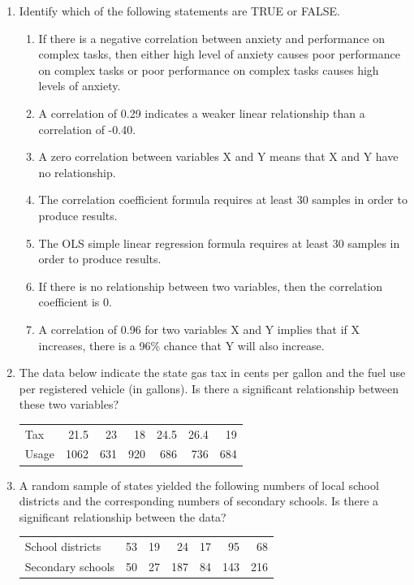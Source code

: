 \documentclass{article}
\begin{document}
\begin{enumerate}
    \item Identify which of the following statements are TRUE or FALSE.
    \begin{enumerate}
        \item If there is a negative correlation between anxiety and performance on complex tasks, then either high level of anxiety causes poor performance on complex tasks or poor performance on complex tasks causes high levels of anxiety.
        \item A correlation of 0.29 indicates a weaker linear relationship than a correlation of -0.40.
        \item A zero correlation between variables X and Y means that X and Y have no relationship.
        \item The correlation coefficient formula requires at least 30 samples in order to produce results.
        \item The OLS simple linear regression formula requires at least 30 samples in order to produce results.
        \item If there is no relationship between two variables, then the correlation coefficient is 0.
        \item A correlation of 0.96 for two variables X and Y implies that if X increases, there is a 96\% chance that Y will also increase.
    \end{enumerate}

    \item The data below indicate the state gas tax in cents per gallon and the fuel use per registered vehicle (in gallons). Is there a significant relationship between these two variables?
    \begin{table}[H]
    \begin{tabular}{lrrrrrr}
    Tax&21.5&23&18&24.5&26.4&19\\
    Usage&1062&631&920&686&736&684\\
    \end{tabular}
    \end{table}

    \item A random sample of states yielded the following numbers of local school districts and the corresponding numbers of secondary schools. Is there a significant relationship between the data?
    \begin{table}[H]
    \begin{tabular}{lrrrrrr}
    School districts & 53 & 19 & 24 & 17 & 95 & 68 \\
    Secondary schools & 50 & 27 & 187 & 84 & 143 & 216 \\
    \end{tabular}
    \end{table}


\end{enumerate}
\end{document}
